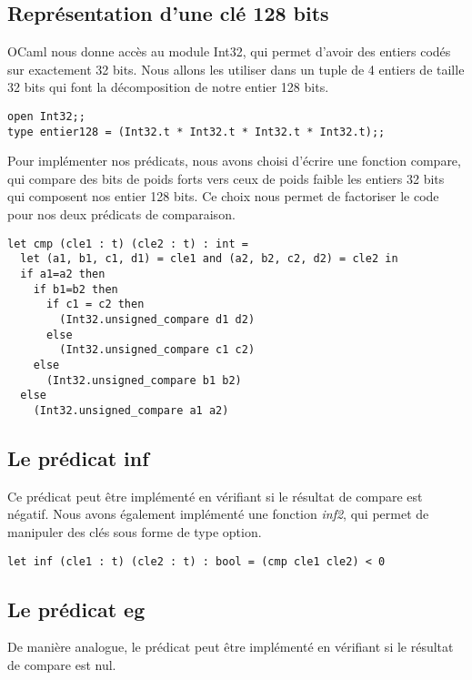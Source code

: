 \documentclass[12pt,a4paper]{article}
\begin{document}
\subsection{Représentation d'une clé 128 bits}

OCaml nous donne accès au module Int32, qui permet d'avoir des entiers codés sur exactement 32 bits. Nous allons les utiliser dans un tuple de 4 entiers de taille 32 bits qui font la décomposition de notre entier 128 bits.

\medskip

\begin{lstlisting}
open Int32;;
type entier128 = (Int32.t * Int32.t * Int32.t * Int32.t);;

\end{lstlisting}


Pour implémenter nos prédicats, nous avons choisi d'écrire une fonction compare, qui compare des bits de poids forts vers ceux de poids faible les entiers 32 bits qui composent nos entier 128 bits. Ce choix nous permet de factoriser le code pour nos deux prédicats de comparaison.

\begin{lstlisting}
let cmp (cle1 : t) (cle2 : t) : int = 
  let (a1, b1, c1, d1) = cle1 and (a2, b2, c2, d2) = cle2 in 
  if a1=a2 then 
    if b1=b2 then 
      if c1 = c2 then
        (Int32.unsigned_compare d1 d2)
      else
        (Int32.unsigned_compare c1 c2)
    else
      (Int32.unsigned_compare b1 b2) 
  else 
    (Int32.unsigned_compare a1 a2)
\end{lstlisting}

\subsection{Le prédicat inf}

Ce prédicat peut être implémenté en vérifiant si le résultat de compare est négatif. Nous avons également implémenté une fonction \textit{inf2}, qui permet de manipuler des clés sous forme de type option.

\begin{lstlisting}
let inf (cle1 : t) (cle2 : t) : bool = (cmp cle1 cle2) < 0

\end{lstlisting}

\subsection{Le prédicat eg}
De manière analogue, le prédicat peut être implémenté en vérifiant si le résultat de compare est nul.
\end{document}
